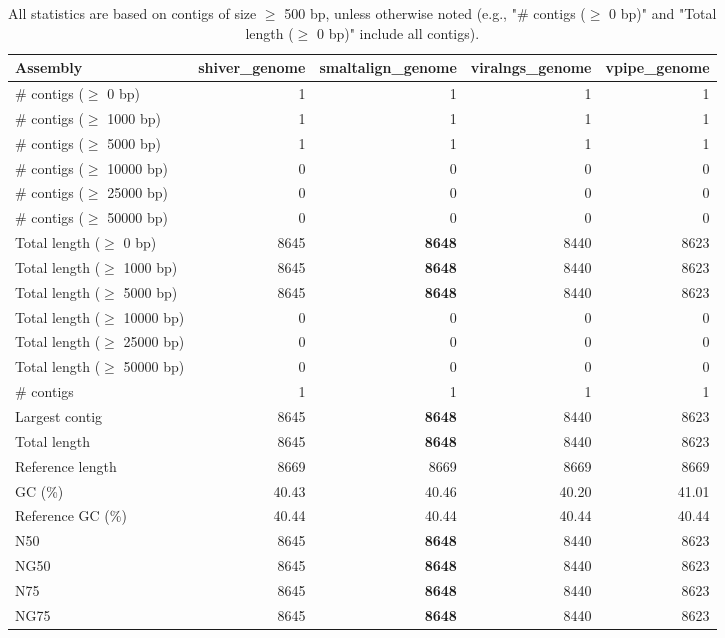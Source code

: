 \documentclass[12pt,a4paper]{article}
\begin{document}
\begin{table}[ht]
\begin{center}
\caption{All statistics are based on contigs of size $\geq$ 500 bp, unless otherwise noted (e.g., "\# contigs ($\geq$ 0 bp)" and "Total length ($\geq$ 0 bp)" include all contigs).}
\begin{tabular}{|l*{4}{|r}|}
\hline
Assembly & shiver\_genome & smaltalign\_genome & viralngs\_genome & vpipe\_genome \\ \hline
\# contigs ($\geq$ 0 bp) & 1 & 1 & 1 & 1 \\ \hline
\# contigs ($\geq$ 1000 bp) & 1 & 1 & 1 & 1 \\ \hline
\# contigs ($\geq$ 5000 bp) & 1 & 1 & 1 & 1 \\ \hline
\# contigs ($\geq$ 10000 bp) & 0 & 0 & 0 & 0 \\ \hline
\# contigs ($\geq$ 25000 bp) & 0 & 0 & 0 & 0 \\ \hline
\# contigs ($\geq$ 50000 bp) & 0 & 0 & 0 & 0 \\ \hline
Total length ($\geq$ 0 bp) & 8645 & {\bf 8648} & 8440 & 8623 \\ \hline
Total length ($\geq$ 1000 bp) & 8645 & {\bf 8648} & 8440 & 8623 \\ \hline
Total length ($\geq$ 5000 bp) & 8645 & {\bf 8648} & 8440 & 8623 \\ \hline
Total length ($\geq$ 10000 bp) & 0 & 0 & 0 & 0 \\ \hline
Total length ($\geq$ 25000 bp) & 0 & 0 & 0 & 0 \\ \hline
Total length ($\geq$ 50000 bp) & 0 & 0 & 0 & 0 \\ \hline
\# contigs & 1 & 1 & 1 & 1 \\ \hline
Largest contig & 8645 & {\bf 8648} & 8440 & 8623 \\ \hline
Total length & 8645 & {\bf 8648} & 8440 & 8623 \\ \hline
Reference length & 8669 & 8669 & 8669 & 8669 \\ \hline
GC (\%) & 40.43 & 40.46 & 40.20 & 41.01 \\ \hline
Reference GC (\%) & 40.44 & 40.44 & 40.44 & 40.44 \\ \hline
N50 & 8645 & {\bf 8648} & 8440 & 8623 \\ \hline
NG50 & 8645 & {\bf 8648} & 8440 & 8623 \\ \hline
N75 & 8645 & {\bf 8648} & 8440 & 8623 \\ \hline
NG75 & 8645 & {\bf 8648} & 8440 & 8623 \\ \hline

\end{tabular}
\end{center}
\end{table}
\end{document}
